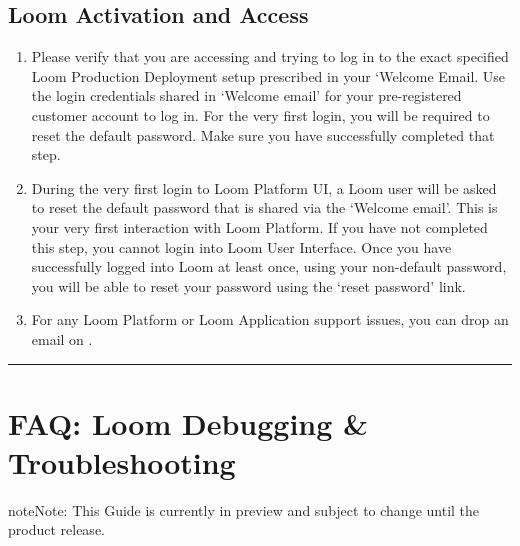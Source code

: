 \documentclass[letterpaper,10pt,english]{sphinxmanual}
\begin{document}
\section{Loom Activation and Access}
\label{\detokenize{loom_trbs_faq:loom-activation-and-access}}\begin{enumerate}
\item {} 

Please verify that you are accessing and trying to log in to the exact specified Loom Production Deployment setup prescribed in your ‘Welcome Email. Use the login credentials shared in ‘Welcome email’ for your pre-registered customer account to log in. For the very first login, you will be required to reset the default password. Make sure you have successfully completed that step.

\item {} 

During the very first login to Loom Platform UI, a Loom user will be asked to reset the default password that is shared via the ‘Welcome email’. This is your very first interaction with Loom Platform.  If you have not completed this step, you cannot login into Loom User Interface.  Once you have successfully logged into Loom at least once, using your non-default password, you will be able to reset your password using the ‘reset password’ link.

\item {} 

For any Loom Platform or Loom Application support issues, you can drop an email on .

\end{enumerate}


\bigskip\hrule\bigskip



\chapter{FAQ: Loom Debugging \& Troubleshooting}
\label{\detokenize{loom_trbs_faq:faq-loom-debugging-troubleshooting}}\label{\detokenize{loom_trbs_faq:faq-debug}}
\begin{sphinxadmonition}{note}{Note:}
This Guide is currently in preview and subject to change until the product release.
\end{sphinxadmonition}
\end{document}
